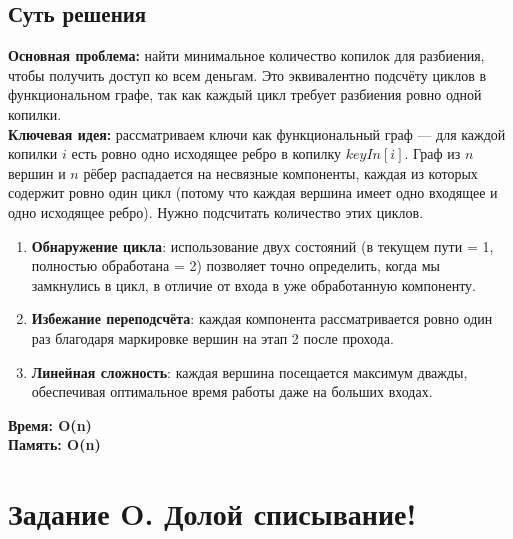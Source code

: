 \documentclass[a4paper,12pt]{article}
\begin{document}
    \subsection*{Суть решения}
    \textbf{Основная проблема:} найти минимальное количество копилок для разбиения, чтобы получить доступ ко всем деньгам. Это эквивалентно подсчёту циклов в функциональном графе, так как каждый цикл требует разбиения ровно одной копилки.\\
    \textbf{Ключевая идея:} рассматриваем ключи как функциональный граф — для каждой копилки $i$ есть ровно одно исходящее ребро в копилку $keyIn[i]$. Граф из $n$ вершин и $n$ рёбер распадается на несвязные компоненты, каждая из которых содержит ровно один цикл (потому что каждая вершина имеет одно входящее и одно исходящее ребро). Нужно подсчитать количество этих циклов.\\
    \begin{enumerate}
        \item \textbf{Обнаружение цикла}: использование двух состояний (в текущем пути = 1, полностью обработана = 2) позволяет точно определить, когда мы замкнулись в цикл, в отличие от входа в уже обработанную компоненту.
        \item \textbf{Избежание переподсчёта}: каждая компонента рассматривается ровно один раз благодаря маркировке вершин на этап 2 после прохода.
        \item \textbf{Линейная сложность}: каждая вершина посещается максимум дважды, обеспечивая оптимальное время работы даже на больших входах.
    \end{enumerate}
    \textbf{Время: O(n)}\\
    \textbf{Память: O(n)}

    \newpage


    \section{Задание O. Долой списывание!}

    
\end{document}
